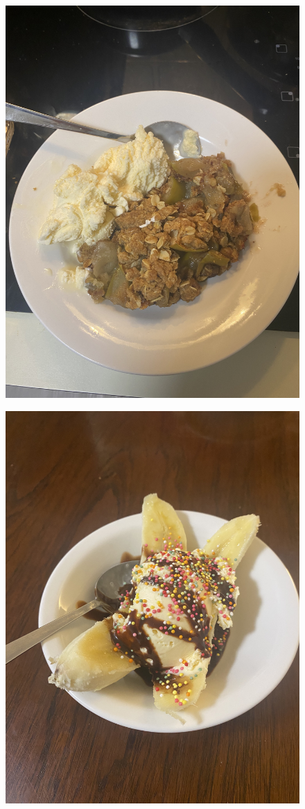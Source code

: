 \documentclass[]{article}
\begin{document}
\newpage\begin{figure}[H]
\begin{center}\hyperref[rec:Apple Crumble]{\includegraphics[keepaspectratio,width=\textheight,height=\textwidth,angle=-90]{Gallery/Apple Crumble}}\caption*{}\label{fig:Apple Crumble}\end{center}
\end{figure}
\newpage\begin{figure}[H]
\begin{center}\hyperref[rec:Banana Split]{\includegraphics[keepaspectratio,width=\textheight,height=\textwidth,angle=-90]{Gallery/Banana Split}}\caption*{}\label{fig:Banana Split}\end{center}
\end{figure}
\end{document}
